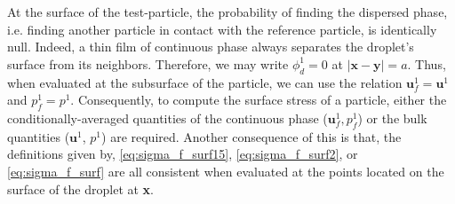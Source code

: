 

At the surface of the test-particle, the probability of finding the dispersed phase, i.e. finding another particle in contact with the reference particle, is identically null. 
Indeed, a thin film of continuous phase always separates the droplet's surface from its neighbors.
Therefore, we may write $\phi_d^1 = 0$ at $|\textbf{x}- \textbf{y}| =a$. 
Thus, when evaluated at the subsurface of the particle, we can use the relation $\textbf{u}_f^1 = \textbf{u}^1$ and $p_f^1 = p^1$. 
Consequently, to compute the surface stress of a particle, either the conditionally-averaged quantities of the continuous phase ($\textbf{u}_f^1, p_f^1$) or the bulk quantities ($\textbf{u}^1$, $p^1$) are required. 
Another consequence of this is that, the definitions given by, \ref{eq:sigma_f_surf15}, \ref{eq:sigma_f_surf2}, or \ref{eq:sigma_f_surf} are all consistent when evaluated at the points located on the surface of the droplet at \textbf{x}. 

